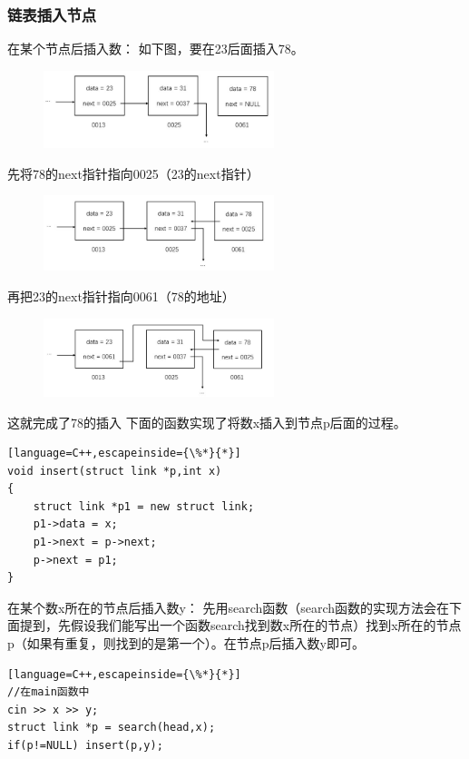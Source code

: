 \documentclass[UTF8]{ctexart}
\begin{document}
\subsubsection{链表插入节点}
在某个节点后插入数：
如下图，要在23后面插入78。
\begin{figure}[H]
	\centering
	\includegraphics[width=0.6\textwidth,keepaspectratio]{picture/5.1.jpg}
\end{figure}
先将78的next指针指向0025（23的next指针）
\begin{figure}[H]
	\centering
	\includegraphics[width=0.6\textwidth,keepaspectratio]{picture/6.1.jpg}
\end{figure}
再把23的next指针指向0061（78的地址）
\begin{figure}[H]
	\centering
	\includegraphics[width=0.6\textwidth,keepaspectratio]{picture/7.1.jpg}
\end{figure}
这就完成了78的插入
下面的函数实现了将数x插入到节点p后面的过程。
\begin{lstlisting}[language=C++,escapeinside={\%*}{*}]
void insert(struct link *p,int x)
{
	struct link *p1 = new struct link;
	p1->data = x;
	p1->next = p->next;
	p->next = p1;
}
\end{lstlisting}
在某个数x所在的节点后插入数y：
先用search函数（search函数的实现方法会在下面提到，先假设我们能写出一个函数search找到数x所在的节点）找到x所在的节点p（如果有重复，则找到的是第一个）。在节点p后插入数y即可。
\begin{lstlisting}[language=C++,escapeinside={\%*}{*}]
//在main函数中
cin >> x >> y;
struct link *p = search(head,x);
if(p!=NULL) insert(p,y);
\end{lstlisting}
\end{document}
